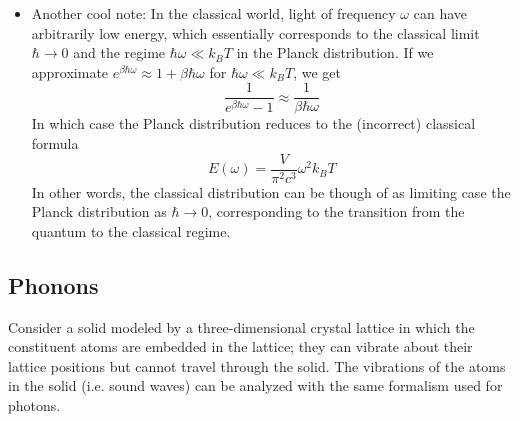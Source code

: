 \documentclass[11pt, a4paper]{article}
\begin{document}
\begin{itemize}
	\item Another cool note: In the classical world, light of frequency $ \omega $ can have arbitrarily low energy, which essentially corresponds to the classical limit $ \hbar \to 0 $ and the regime $ \hbar \omega \ll k_{B}T $ in the Planck distribution. If we approximate $ e^{\beta\hbar\omega} \approx 1 + \beta \hbar \omega$ for $ \hbar \omega \ll k_{B}T $, we get
	\begin{equation*}
		\frac{1}{e^{\beta \hbar \omega} - 1} \approx \frac{1}{\beta \hbar \omega}
	\end{equation*}
	In which case the Planck distribution reduces to the (incorrect) classical formula
	\begin{equation*}
		E(\omega) = \frac{V}{\pi^{2}c^{3}}\omega^{2}k_{B}T
	\end{equation*}
	In other words, the classical distribution can be though of as limiting case the Planck distribution as $ \hbar \to 0 $, corresponding to the transition from the quantum to the classical regime.
\end{itemize}

\subsection{Phonons}
Consider a solid modeled by a three-dimensional crystal lattice in which the constituent atoms are embedded in the lattice; they can vibrate about their lattice positions but cannot travel through the solid. The vibrations of the atoms in the solid (i.e. sound waves) can be analyzed with the same formalism used for photons.
\end{document}
